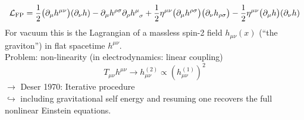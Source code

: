 \begin{remark}
\begin{equation}
    \lagrangian_{\text{FP}} =
    \frac{1}{2} \left( \partial_\mu h^{\mu\nu} \right) \left( \partial_\nu h \right)
    - \partial_\mu h^{\rho \sigma} \partial_\rho \tensor{h}{^\mu_\sigma}
    + \frac{1}{2} \eta^{\mu\nu} \left( \partial_\mu h^{\rho\sigma} \right) \left( \partial_\nu h_{\rho \sigma} \right)
    - \frac{1}{2} \eta^{\mu\nu} \left( \partial_\mu h \right) \left( \partial_\nu h \right)
\end{equation}
For vacuum this is the Lagrangian of a massless spin-2 field $h_{\mu\nu}(x)$ (``the graviton'') in flat spacetime $h^{\mu\nu}$. \\
Problem: non-linearity (in electrodynamics: linear coupling)
\begin{equation}
    T_{\mu\nu}h^{\mu\nu} \rightarrow h_{\mu\nu}^{(2)} \propto \left( h_{\mu\nu}^{(1)}  \right)^2
\end{equation}
$\rightarrow$ Deser 1970: Iterative procedure \\
$\hookrightarrow$ including gravitational self energy and resuming one recovers the full nonlinear Einstein equations.
\end{remark}

\newpage

